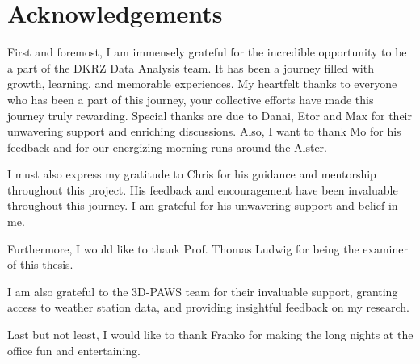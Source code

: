 \section*{Acknowledgements}

First and foremost, I am immensely grateful for the incredible opportunity to be a part of the DKRZ Data Analysis team.
It has been a journey filled with growth, learning, and memorable experiences.
My heartfelt thanks to everyone who has been a part of this journey, your collective efforts have made this journey truly rewarding. Special thanks are due to Danai, Etor and Max for their unwavering support and enriching discussions.
Also, I want to thank Mo for his feedback and for our energizing morning runs around the Alster.

I must also express my gratitude to Chris for his guidance and mentorship throughout this project.
His feedback and encouragement have been invaluable throughout this journey.
I am grateful for his unwavering support and belief in me.

Furthermore, I would like to thank Prof. Thomas Ludwig for being the examiner of this thesis.

I am also grateful to the 3D-PAWS team for their invaluable support, granting access to weather station data, and providing insightful feedback on my research.

Last but not least, I would like to thank Franko for making the long nights at the office fun and entertaining.






